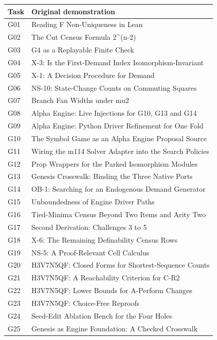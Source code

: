 \documentclass[
  11pt,
]{article}
\begin{document}
\begin{longtable}[]{@{}ll@{}}
\toprule\noalign{}
Task & Original demonstration \\
\midrule\noalign{}
\endhead
\bottomrule\noalign{}
\endlastfoot
G01 & Reading F Non-Uniqueness in Lean \\
G02 & The Cut Census Formula 2\^{}(n-2) \\
G03 & G4 as a Replayable Finite Check \\
G04 & X-3: Is the First-Demand Index Isomorphism-Invariant \\
G05 & X-1: A Decision Procedure for Demand \\
G06 & NS-10: State-Change Counts on Commuting Squares \\
G07 & Branch Fan Widths under mu2 \\
G08 & Alpha Engine: Live Injections for G10, G13 and G14 \\
G09 & Alpha Engine: Python Driver Refinement for One Fold \\
G10 & The Symbol Game as an Alpha Engine Proposal Source \\
G11 & Wiring the m114 Solver Adapter into the Search Policies \\
G12 & Prop Wrappers for the Parked Isomorphism Modules \\
G13 & Genesis Crosswalk: Binding the Three Native Ports \\
G14 & OB-1: Searching for an Endogenous Demand Generator \\
G15 & Unboundedness of Engine Driver Paths \\
G16 & Tied-Minima Census Beyond Two Items and Arity Two \\
G17 & Second Derivation: Challenges 3 to 5 \\
G18 & X-6: The Remaining Definability Census Rows \\
G19 & NS-5: A Proof-Relevant Cell Calculus \\
G20 & H3V7N5QF: Closed Forms for Shortest-Sequence Counts \\
G21 & H3V7N5QF: A Reachability Criterion for C-R2 \\
G22 & H3V7N5QF: Lower Bounds for A-Perform Changes \\
G23 & H3V7N5QF: Choice-Free Reproofs \\
G24 & Seed-Edit Ablation Bench for the Four Holes \\
G25 & Genesis as Engine Foundation: A Checked Crosswalk \\
\end{longtable}
\end{document}

